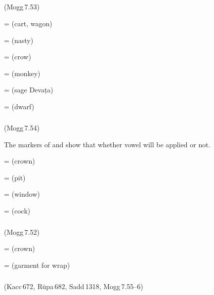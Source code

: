 \subparagraph*{} (Mogg\,7.53)\label{pacckx:adta}

 =  (cart, wagon)\par
{} =  (nasty)\par
{} =  (crow)\par
{} =  (monkey)\par
{} =  (sage Deva\d ta)\par
{} =  (dwarf)\par

\subparagraph*{} (Mogg\,7.54)\label{pacckx:udta2}\label{pacckx:aadtadna}\label{pacckx:aadta}\label{pacckx:kudtaka}

The markers of  and  show that whether vowel  will be applied or not.

 =  (crown)\par
{} =  (pit)\par
{} =  (window)\par
{} =  (cock)\par

\subparagraph*{} (Mogg\,7.52)\label{pacckx:kiidta}

 =  (crown)\par
{} =  (garment for wrap)\par

\subparagraph*{} (Kacc\,672, R\=upa\,682, Sadd\,1318, Mogg\,7.55--6)\label{pacckx:dtha1}


